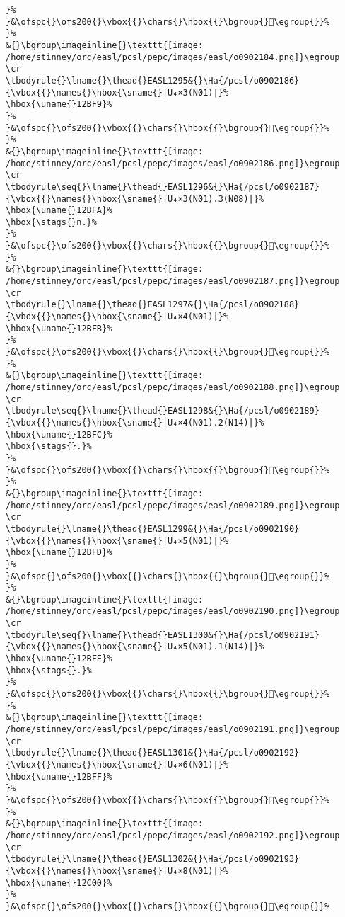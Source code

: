 \begin{verbatim}
}%
}&\ofspc{}\ofs200{}\vbox{{}\chars{}\hbox{{}\bgroup{}𒯸\egroup{}}%
}%
&{}\bgroup\imageinline{}\texttt{[image: /home/stinney/orc/easl/pcsl/pepc/images/easl/o0902184.png]}\egroup
\cr
\tbodyrule{}\lname{}\thead{}EASL1295&{}\Ha{/pcsl/o0902186}{\vbox{{}\names{}\hbox{\sname{}|U₄×3(N01)|}%
\hbox{\uname{}12BF9}%
}%
}&\ofspc{}\ofs200{}\vbox{{}\chars{}\hbox{{}\bgroup{}𒯹\egroup{}}%
}%
&{}\bgroup\imageinline{}\texttt{[image: /home/stinney/orc/easl/pcsl/pepc/images/easl/o0902186.png]}\egroup
\cr
\tbodyrule\seq{}\lname{}\thead{}EASL1296&{}\Ha{/pcsl/o0902187}{\vbox{{}\names{}\hbox{\sname{}|U₄×3(N01).3(N08)|}%
\hbox{\uname{}12BFA}%
\hbox{\stags{}n.}%
}%
}&\ofspc{}\ofs200{}\vbox{{}\chars{}\hbox{{}\bgroup{}𒯺\egroup{}}%
}%
&{}\bgroup\imageinline{}\texttt{[image: /home/stinney/orc/easl/pcsl/pepc/images/easl/o0902187.png]}\egroup
\cr
\tbodyrule{}\lname{}\thead{}EASL1297&{}\Ha{/pcsl/o0902188}{\vbox{{}\names{}\hbox{\sname{}|U₄×4(N01)|}%
\hbox{\uname{}12BFB}%
}%
}&\ofspc{}\ofs200{}\vbox{{}\chars{}\hbox{{}\bgroup{}𒯻\egroup{}}%
}%
&{}\bgroup\imageinline{}\texttt{[image: /home/stinney/orc/easl/pcsl/pepc/images/easl/o0902188.png]}\egroup
\cr
\tbodyrule\seq{}\lname{}\thead{}EASL1298&{}\Ha{/pcsl/o0902189}{\vbox{{}\names{}\hbox{\sname{}|U₄×4(N01).2(N14)|}%
\hbox{\uname{}12BFC}%
\hbox{\stags{}.}%
}%
}&\ofspc{}\ofs200{}\vbox{{}\chars{}\hbox{{}\bgroup{}𒯼\egroup{}}%
}%
&{}\bgroup\imageinline{}\texttt{[image: /home/stinney/orc/easl/pcsl/pepc/images/easl/o0902189.png]}\egroup
\cr
\tbodyrule{}\lname{}\thead{}EASL1299&{}\Ha{/pcsl/o0902190}{\vbox{{}\names{}\hbox{\sname{}|U₄×5(N01)|}%
\hbox{\uname{}12BFD}%
}%
}&\ofspc{}\ofs200{}\vbox{{}\chars{}\hbox{{}\bgroup{}𒯽\egroup{}}%
}%
&{}\bgroup\imageinline{}\texttt{[image: /home/stinney/orc/easl/pcsl/pepc/images/easl/o0902190.png]}\egroup
\cr
\tbodyrule\seq{}\lname{}\thead{}EASL1300&{}\Ha{/pcsl/o0902191}{\vbox{{}\names{}\hbox{\sname{}|U₄×5(N01).1(N14)|}%
\hbox{\uname{}12BFE}%
\hbox{\stags{}.}%
}%
}&\ofspc{}\ofs200{}\vbox{{}\chars{}\hbox{{}\bgroup{}𒯾\egroup{}}%
}%
&{}\bgroup\imageinline{}\texttt{[image: /home/stinney/orc/easl/pcsl/pepc/images/easl/o0902191.png]}\egroup
\cr
\tbodyrule{}\lname{}\thead{}EASL1301&{}\Ha{/pcsl/o0902192}{\vbox{{}\names{}\hbox{\sname{}|U₄×6(N01)|}%
\hbox{\uname{}12BFF}%
}%
}&\ofspc{}\ofs200{}\vbox{{}\chars{}\hbox{{}\bgroup{}𒯿\egroup{}}%
}%
&{}\bgroup\imageinline{}\texttt{[image: /home/stinney/orc/easl/pcsl/pepc/images/easl/o0902192.png]}\egroup
\cr
\tbodyrule{}\lname{}\thead{}EASL1302&{}\Ha{/pcsl/o0902193}{\vbox{{}\names{}\hbox{\sname{}|U₄×8(N01)|}%
\hbox{\uname{}12C00}%
}%
}&\ofspc{}\ofs200{}\vbox{{}\chars{}\hbox{{}\bgroup{}𒰀\egroup{}}%

\end{verbatim}
